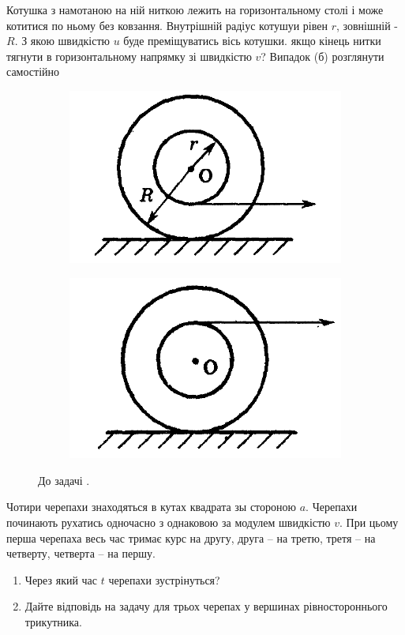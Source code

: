 \begin{problem}{7}
	Котушка з намотаною на ній ниткою лежить на горизонтальному столі і може котитися по ньому без ковзання. Внутрішній радіус котушуи рівен $r$, зовнішній - $R$. З якою швидкістю $u$ буде преміщуватись вісь котушки. якщо кінець нитки тягнути в горизонтальному напрямку зі швидкістю $v$? Випадок (б) розглянути самостійно
	\begin{figure}[h!]
		\centering
		\begin{subfigure}{.4\textwidth}
			\centering
			\includegraphics[width=.5\textwidth]{class3/coil_a.png}
			\caption{}
			\label{coil_a}
		\end{subfigure}
		\begin{subfigure}{.4\textwidth}
			\centering
			\includegraphics[width=.5\textwidth]{class3/coil_b.png}
			\caption{}
			\label{coil_b}
		\end{subfigure}
		\caption{До задачі .}
	\end{figure}
\end{problem}


\begin{problem}{9}
	Чотири черепахи знаходяться в кутах квадрата зы стороною $a$. Черепахи починають рухатись одночасно з однаковою за модулем швидкістю $v$. При цьому перша черепаха весь час тримає курс на другу, друга -- на третю, третя -- на четверту, четверта -- на першу. 
	\begin{enumerate}
		\item Через який час $t$ черепахи зустрінуться?
		\item Дайте відповідь на задачу для трьох черепах у вершинах рівностороннього трикутника.
	\end{enumerate}
	 
\end{problem}

